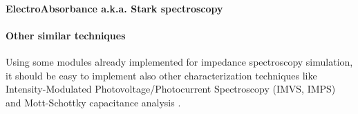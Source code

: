 \paragraph{ElectroAbsorbance a.k.a. Stark spectroscopy}



\paragraph{Other similar techniques}
Using some modules already implemented for impedance spectroscopy simulation, it should be easy to implement also other characterization techniques like Intensity-Modulated Photovoltage/Photocurrent Spectroscopy (IMVS, IMPS) \cite{Pockett2015,Guillen2014} and Mott-Schottky capacitance analysis \cite{Almora2016}.



